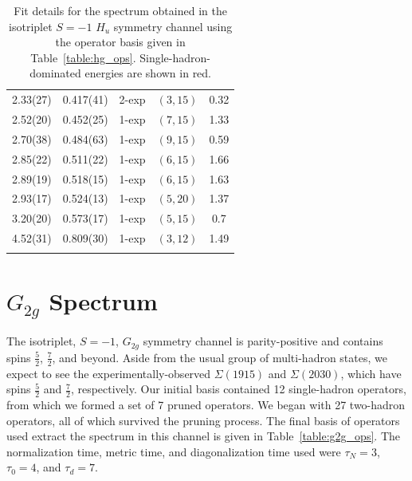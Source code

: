 \begin{longtabu}{c|c|c|c|c}
        2.33(27)&0.417(41)&2{-}exp&$(3, 15)$&0.32 \\
        2.52(20)&0.452(25)&1{-}exp&$(7, 15)$&1.33 \\
        2.70(38)&0.484(63)&1{-}exp&$(9, 15)$&0.59 \\
        2.85(22)&0.511(22)&1{-}exp&$(6, 15)$&1.66 \\
        2.89(19)&0.518(15)&1{-}exp&$(6, 15)$&1.63 \\
        \rowfont{\color{red}}
        2.93(17)&0.524(13)&1{-}exp&$(5, 20)$&1.37 \\ 
        \rowfont{\color{red}}
        3.20(20)&0.573(17)&1{-}exp&$(5, 15)$&0.7 \\
        4.52(31)&0.809(30)&1{-}exp&$(3, 12)$&1.49 \\
    \caption{Fit details for the spectrum obtained in the isotriplet $S=-1$ $H_u$ symmetry channel using the operator basis given in Table~\ref{table:hg_ops}. Single-hadron-dominated energies are shown in red.}\label{table:hu_fits}
\end{longtabu}
\renewcommand{\arraystretch}{1.5}

\section{$G_{2g}$ Spectrum}
The isotriplet, $S=-1$, $G_{2g}$ symmetry channel is parity-positive and contains spins $\frac{5}{2}$, $\frac{7}{2}$, and beyond. Aside from the usual group of multi-hadron states, we expect to see the experimentally-observed $\Sigma(1915)$ and $\Sigma(2030)$, which have spins $\frac{5}{2}$ and $\frac{7}{2}$, respectively. Our initial basis contained 12 single-hadron operators, from which we formed a set of 7 pruned operators. We began with 27 two-hadron operators, all of which survived the pruning process. The final basis of operators used extract the spectrum in this channel is given in Table~\ref{table:g2g_ops}. The normalization time, metric time, and diagonalization time used were $\tau_N=3$, $\tau_0=4$, and $\tau_d=7$.

